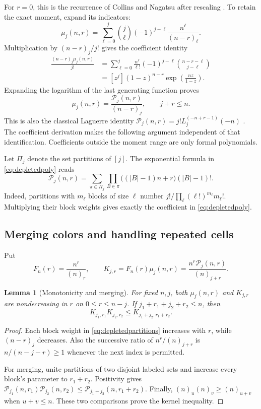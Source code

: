 \documentclass[11pt]{article}
\newtheorem{lemma}[theorem]{Lemma}
\theoremstyle{definition}
\theoremstyle{remark}
\newcommand{\1}{\mathbf 1}
\begin{document}
For $r=0$, this is the recurrence of Collins and Nagatsu after rescaling \cite[Proposition 3.3, equation (16)]{CN}. To retain the exact moment, expand its indicators:
\[
\mu_j(n,r)=\sum_{\ell=0}^j
\binom j\ell(-1)^{j-\ell}\frac{n^\ell}{(n-r)_\ell}.
\]
Multiplication by $(n-r)_j/j!$ gives the coefficient identity
\begin{align*}
\frac{(n-r)_j\mu_j(n,r)}{j!}
&=\sum_{\ell=0}^j\frac{n^\ell}{\ell!}
(-1)^{j-\ell}\binom{n-r-\ell}{j-\ell}\\
&=[z^j](1-z)^{n-r}\exp\left(\frac{nz}{1-z}\right).
\end{align*}
Expanding the logarithm of the last generating function proves
\begin{equation}\label{eq:poly-moment}
\mu_j(n,r)=\frac{\mathcal P_j(n,r)}{(n-r)_j},
\qquad j+r\le n.
\end{equation}
This is also the classical Laguerre identity
$\mathcal P_j(n,r)=j!L_j^{(-n+r-1)}(-n)$ \cite[equation 18.12.13]{DLMF}. The coefficient derivation makes the following argument independent of that identification. Coefficients outside the moment range are only formal polynomials.

Let $\Pi_j$ denote the set partitions of $[j]$. The exponential formula in \eqref{eq:depletedpoly} reads
\begin{equation}\label{eq:depletedpartitions}
\mathcal P_j(n,r)=
\sum_{\pi\in\Pi_j}\prod_{B\in\pi}
\bigl((|B|-1)n+r\bigr)(|B|-1)!.
\end{equation}
Indeed, partitions with $m_\ell$ blocks of size $\ell$ number
$j!/\prod_\ell(\ell!)^{m_\ell}m_\ell!$. Multiplying their block weights gives exactly the coefficient in \eqref{eq:depletedpoly}.

\subsection{Merging colors and handling repeated cells}

Put
\[
F_n(r)=\frac{n^r}{(n)_r},\qquad
K_{j,r}=F_n(r)\mu_j(n,r)
=\frac{n^r\mathcal P_j(n,r)}{(n)_{j+r}}.
\]
\begin{lemma}[Monotonicity and merging]\label{lem:mixedmerge}
For fixed $n,j$, both $\mu_j(n,r)$ and $K_{j,r}$ are nondecreasing in $r$ on $0\le r\le n-j$. If $j_1+r_1+j_2+r_2\le n$, then
\[
K_{j_1,r_1}K_{j_2,r_2}\le K_{j_1+j_2,r_1+r_2}.
\]
\end{lemma}
\begin{proof}
Each block weight in \eqref{eq:depletedpartitions} increases with $r$, while $(n-r)_j$ decreases. Also the successive ratio of $n^r/(n)_{j+r}$ is $n/(n-j-r)\ge1$ whenever the next index is permitted.

For merging, unite partitions of two disjoint labeled sets and increase every block's parameter to $r_1+r_2$. Positivity gives
$\mathcal P_{j_1}(n,r_1)\mathcal P_{j_2}(n,r_2)
\le\mathcal P_{j_1+j_2}(n,r_1+r_2)$.
Finally, $(n)_u(n)_v\ge(n)_{u+v}$ when $u+v\le n$. These two comparisons prove the kernel inequality.
\end{proof}
\end{document}
